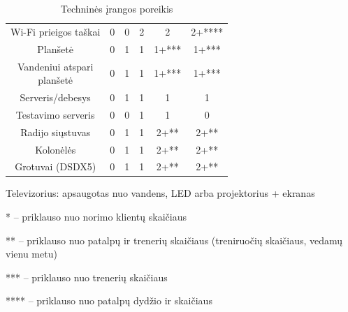 \begin{table}[h]
\begin{tabular}{cccccc}
        Wi-Fi prieigos taškai & 0 & 0 & 2 & 2 & 2+**** \\
        
        Planšetė & 0 & 1 & 1 & 1+*** & 1+*** \\
        
        \makecell{Vandeniui atspari \\ planšetė}   & 0 & 1 & 1 & 1+*** & 1+***   \\
        
        Serveris/debesys & 0 & 1 & 1 & 1 & 1 \\
        
        Testavimo serveris & 0  & 0 & 1 & 1 & 0 \\
        
        Radijo siųstuvas & 0 & 1 & 1 & 2+** & 2+** \\
        
        Kolonėlės & 0 & 1 & 1 & 2+**  & 2+** \\
        
        Grotuvai (DSDX5) & 0 & 1 & 1 & 2+** &  2+**\\
        
        
    \end{tabular}
    \caption{Techninės įrangos poreikis}
    \label{tab:irangos-poreikis}
\end{table}

Televizorius: apsaugotas nuo vandens, LED arba projektorius + ekranas

* -- priklauso nuo norimo klientų skaičiaus

** -- priklauso nuo patalpų ir trenerių skaičiaus (treniruočių skaičiaus, vedamų vienu metu)

*** -- priklauso nuo trenerių skaičiaus

**** -- priklauso nuo patalpų dydžio ir skaičiaus
